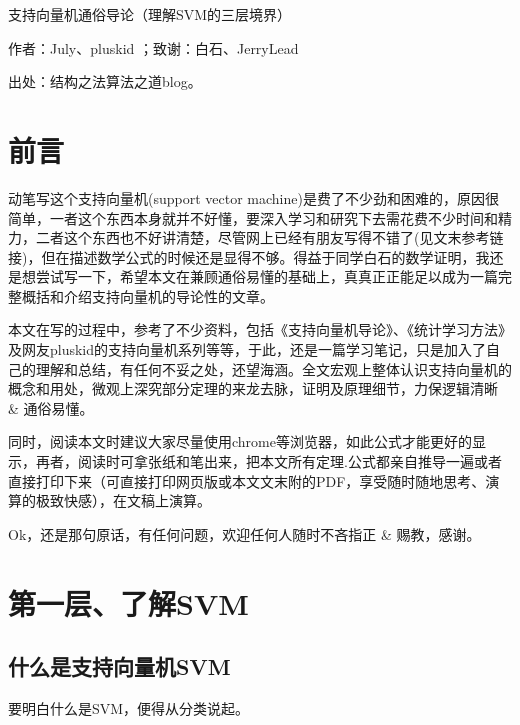 \documentclass[a4paper,12pt]{article}
\begin{document}

\cnarticle			%
\yemeiclean  %

\begin{center}
\sihao   支持向量机通俗导论（理解SVM的三层境界）
\wuhao

作者：July、pluskid ；致谢：白石、JerryLead

出处：结构之法算法之道blog。

\end{center}
\section*{前言}
动笔写这个支持向量机(support vector machine)是费了不少劲和困难的，原因很简单，一者这个东西本身就并不好懂，要深入学习和研究下去需花费不少时间和精力，二者这个东西也不好讲清楚，尽管网上已经有朋友写得不错了(见文末参考链接)，但在描述数学公式的时候还是显得不够。得益于同学白石的数学证明，我还是想尝试写一下，希望本文在兼顾通俗易懂的基础上，真真正正能足以成为一篇完整概括和介绍支持向量机的导论性的文章。

本文在写的过程中，参考了不少资料，包括《支持向量机导论》、《统计学习方法》及网友pluskid的支持向量机系列等等，于此，还是一篇学习笔记，只是加入了自己的理解和总结，有任何不妥之处，还望海涵。全文宏观上整体认识支持向量机的概念和用处，微观上深究部分定理的来龙去脉，证明及原理细节，力保逻辑清晰 \& 通俗易懂。

同时，阅读本文时建议大家尽量使用chrome等浏览器，如此公式才能更好的显示，再者，阅读时可拿张纸和笔出来，把本文所有定理.公式都亲自推导一遍或者直接打印下来（可直接打印网页版或本文文末附的PDF，享受随时随地思考、演算的极致快感），在文稿上演算。

Ok，还是那句原话，有任何问题，欢迎任何人随时不吝指正 \& 赐教，感谢。

\section{第一层、了解SVM}
\subsection{什么是支持向量机SVM}
要明白什么是SVM，便得从分类说起。
\end{document}
